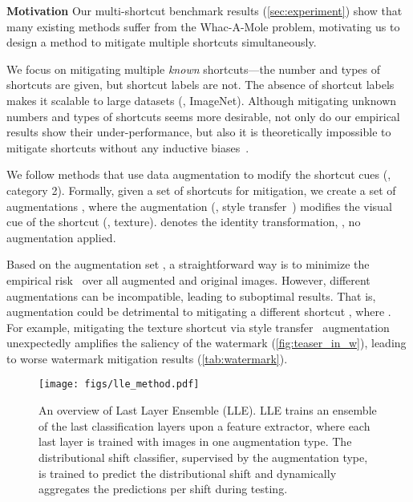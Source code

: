 \documentclass[10pt,twocolumn,letterpaper]{article}
\begin{document}
\noindent \textbf{Motivation} \quad Our multi-shortcut benchmark results (\cref{sec:experiment}) show that many existing methods suffer from the Whac-A-Mole problem, motivating us to design a method to mitigate multiple shortcuts simultaneously.

We focus on mitigating multiple \textit{known} shortcuts---the number and types of shortcuts are given, but shortcut labels are not. The absence of shortcut labels makes it scalable to large datasets (\eg, ImageNet). Although mitigating unknown numbers and types of shortcuts seems more desirable, not only do our empirical results show their under-performance, but also it is theoretically impossible to mitigate shortcuts without any inductive biases~\cite{lin2022Adv.NeuralInf.Process.Syst.ZINa}.

We follow methods that use data augmentation to modify the shortcut cues (\ie, category 2). Formally, given a set of  shortcuts  for mitigation, we create a set of augmentations , where the augmentation  (\eg, style transfer~\cite{geirhos2019Int.Conf.Learn.Represent.ImageNettrained}) modifies the visual cue of the shortcut  (\eg, texture).  denotes the identity transformation, \ie, no augmentation applied.

Based on the augmentation set , a straightforward way is to minimize the empirical risk~\cite{vapnik1999Nature} over all augmented and original images.
However, different augmentations can be incompatible, leading to suboptimal results. That is, augmentation  could be detrimental to mitigating a different shortcut , where . For example, mitigating the texture shortcut via style transfer~\cite{geirhos2019Int.Conf.Learn.Represent.ImageNettrained} augmentation unexpectedly amplifies the saliency of the watermark (\cref{fig:teaser_in_w}), leading to worse watermark mitigation results (\cref{tab:watermark}).


\begin{figure}[t]
  \centering
  \texttt{[image: figs/lle\_method.pdf]}
  \caption{An overview of Last Layer Ensemble (LLE). LLE trains an ensemble of the last classification layers upon a feature extractor, where each last layer is trained with images in one augmentation type. The distributional shift classifier, supervised by the augmentation type, is trained to predict the distributional shift and dynamically aggregates the predictions per shift during testing.}
  \label{fig:method_last_layer_ensemble}
  \vspace{-6mm}
\end{figure}
\end{document}
